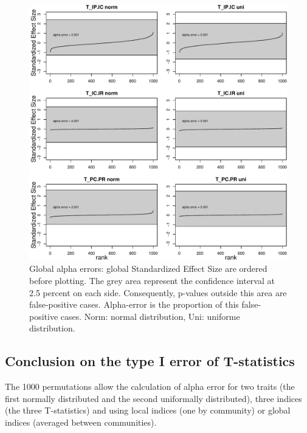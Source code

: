 \documentclass[12pt]{article}\usepackage[]{graphicx}\usepackage[]{color}
\makeatletter
\def\maxwidth{ %
  \ifdim\Gin@nat@width>\linewidth
    \linewidth
  \else
    \Gin@nat@width
  \fi
}
\newenvironment{knitrout}{}{} %
\makeatother
\begin{document}
\begin{knitrout}
\begin{figure}
{\centering \includegraphics[width=\maxwidth]{figure/No_filter_summary_plot-1} 

}

\caption[Global alpha errors]{Global alpha errors: global Standardized Effect Size are ordered before plotting. The grey area represent the confidence interval at 2.5 percent on each side. Consequently, p-values outside this area are false-positive cases. Alpha-error is the proportion of this false-positive cases. Norm: normal distribution, Uni: uniforme distribution.}\label{fig:No_filter_summary_plot}
\end{figure}


\end{knitrout}

  \subsection {Conclusion on the type I error of T-statistics}

The 1000 permutations allow the calculation of alpha error for two traits (the first normally distributed and the second uniformally distributed), three indices (the three T-statistics) and using local indices (one by community) or global indices (averaged between communities).
\end{document}
